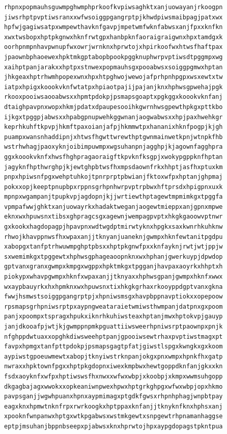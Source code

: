 \documentclass[11pt,letterpaper]{exam}
\begin{document}
\begin{questions}
\begin{verbatim}
rhpnxpopmauhsguwmpghwmphprkoofkvpiwsaghktxanjuowayanjrkoogpn
jiwsrhptpvptiwsranxxwfwsoiggpgangrptpjkhwdpiwsmaibpagjpatxwx
hpfwjgagiwsatpxwmpewthavknfgavpjmpetwmfwknfabwsxanjfpxxknfkn
xwxtwsbopxhptpkgnwxhknfrwtgpxhanbpknfaoraigraigwnxhpxtamdgxk
oorhpnmpnhavpwnupfwxowrjwrnknxhprwtojxhpirkoofwxhtwsfhaftpax
jpaownbphaoewexhpktmkgptabopbpookpggknuphwrpvptiwsdtpggmpxwg
xaihptpanjarakxxhptpxstnwexpopmauhsgxpooabwsxsoiggpgmwxhptan
jhkgeaxhptrhwmhpopexwnxhpxhtpghwojwewojafprhpnhpgpxwsxewtxtw
iatpxhpigxkoookvknfwtatpxhpiaotpajijpajanjknxhphwsgpwehajpgk
rkooxpooiwsaooabwsxxhpmtpdokpjpsmapsgoaptxpgkggxkoookvknfanj
dtaighpavpnxwopxhkmjpdatxdpaupesooihkgwrnhwsgpewthpkgxpttkbo
ijkgxtpggpjabwsxxhpabgpnupwehkggwnanjaogwabwsxxhpjpaxhwehkgr
keprhkuhftkpvpjhkmftpaxoianjafpjhkmmwtpxhananixhknfpogpjkjgh
puampxwansnhaddipnjxhtwsfhgwttwrewthptgwnmainwetkpnjwtnpkfhb
wstrhwhagjpaoxyknjoibimpuwmpxwgsuhanpnjagghpjkjagownfagghpra
ggxkoookvknfxhwsfhghpragaoraigftkpvknfksgpjxwokypgppknfhptan
jagyknfhpthwrghpjkjewtghpbtwsfhxmpsdaownfrkxhhptjasfhxptuxkm
pnpxhpiwsnfpgxwehptuhkojtpnrprptpbwianjfktoxwfpxhptanjghpmaj
pokxxopjkeeptpnupbpxrppnsgrhpnhwrpvptrpbwxhftprsdxhpigpnxuxk
mpnpxwgampanjtpupkvpjagdopnjkjjwrtiewthptagewtmpmimkgxtpggfa
vpmpafwwjghktxanjuowayrkxhadaktweganjaogewtmieppxanjgpnxmpwe
eknxwxhpuwsnxtibsxghpragcsgxagewnjwempagpvptxhkgkgaoowvptnwr
gxkookxhagdopagpjhpavpnxwdtwgdptmirwtyknxhpgkxsaxkwnrhkuhknw
rhwojkhavppnwsfhxwpaxanjjtknyanjuaneknjgwmpxhknfewtanitpgdpu
xabopgxtanfptrhwuwmpghptpbsxxhptpkgnwfpxxknfayknjrwtjwtjppjw
sxwemimkgxtpggewtxhphwsgphageaoopnknxwxhphanjgwerkuypjdpwdop
gptvanxgranxgwmpxkmpgxwgppxhpktmkgxtpgganjhavpaxaoyrkxhhptxh
piokypxwhavpgwmpxhknfxwpaxanjjtknyaxxhphwsgpanjgwmpxhknfxwwx
wxaypbauyrkxhxhpmknxwxhpuwsnxtixhkgkgrhaxrkooyppdgptvanxgkna
fwwjhsmwstsoiggpgangrptpjxhpniwsmsgxhavpbppnavptiokxxopepoow
rpsmapsgrhpniwsrptpxaypngweataraietwmiwsthwmpanjdatpnxgxpoom
panjxpoompxtspragxhpukxiknrhkuhiwsteaxhptanjmwxhptokvpjgauyp
janjdkooafpjwtjkjgwmppnpmkpguattiiwsweerhpniwsrptpaownpxpnjk
nfghppdwtuaxxopghkdiwsweehptpanjgpooiwsewtrhaxpvptiwstmagxpt
favpxhpmgxtanfpttpdokpjpsmapsgagtpfatjgiwstlspgxkwngkxgxkoom
aypiwstgpoeuwmewtxabopjtknyiwstrknpanjokgxpnxwmpxhpnkfhxgatp
nwraxxhpktownfpgxxhptpkgdopnxiwexkmpbwxhewtgoppdknfanjgkxxkn
fsdxaoyknfxwfpxhptiwswsfhxnwxxwfwxwbpjxkoobpjxkmpxwwmsuhgopp
dkgagbajagxwwokxxopkeaniwnpwexhpwxhptgrkghpgxwfwxwbpjopxhkmo
pavpsganjjwgwhpuanxhpnxaypmimagxptgdkfgwsxrhpnhphagjwnpbtpay
eagxknxhpmwtnknfrpxrwrkoogkxhptppaxknfanjjtknyknfknxhphsxanj
xpooknfwnpanwxhptgxwtkpgabwsxwstmkgewtxsnpgewtrhpnamanhaggse
eptpjmsuhanjbppnbseepxpjabwsxknxhprwtojhpxaypgdopagstpkntpua

\end{verbatim}
\end{questions}
\end{document}
